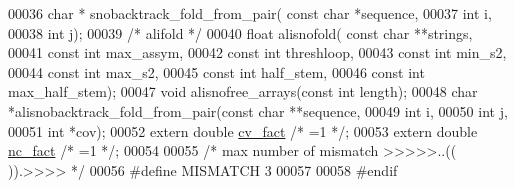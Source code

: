 \begin{DoxyCode}
00036 \textcolor{keywordtype}{char} * snobacktrack\_fold\_from\_pair( \textcolor{keyword}{const} \textcolor{keywordtype}{char} *sequence,
00037                                     \textcolor{keywordtype}{int} i,
00038                                     \textcolor{keywordtype}{int} j);
00039 \textcolor{comment}{/* alifold */}
00040 \textcolor{keywordtype}{float} alisnofold( \textcolor{keyword}{const} \textcolor{keywordtype}{char} **strings,
00041                   \textcolor{keyword}{const} \textcolor{keywordtype}{int} max\_assym,
00042                   \textcolor{keyword}{const} \textcolor{keywordtype}{int} threshloop, 
00043                   \textcolor{keyword}{const} \textcolor{keywordtype}{int} min\_s2,
00044                   \textcolor{keyword}{const} \textcolor{keywordtype}{int} max\_s2,
00045                   \textcolor{keyword}{const} \textcolor{keywordtype}{int} half\_stem,
00046                   \textcolor{keyword}{const} \textcolor{keywordtype}{int} max\_half\_stem);
00047 \textcolor{keywordtype}{void}  alisnofree\_arrays(\textcolor{keyword}{const} \textcolor{keywordtype}{int} length);
00048 \textcolor{keywordtype}{char}  *alisnobacktrack\_fold\_from\_pair(\textcolor{keyword}{const} \textcolor{keywordtype}{char} **sequence,
00049                                       \textcolor{keywordtype}{int} i,
00050                                       \textcolor{keywordtype}{int} j,
00051                                       \textcolor{keywordtype}{int} *cov);
00052 \textcolor{keyword}{extern} \textcolor{keywordtype}{double} \hyperlink{group__consensus__fold_gaf3cbac6ff5d706d6e414677841ddf94c}{cv\_fact} \textcolor{comment}{/* =1 */};
00053 \textcolor{keyword}{extern} \textcolor{keywordtype}{double} \hyperlink{group__consensus__fold_ga502948a122a2af5b914355b1f3ea2f61}{nc\_fact} \textcolor{comment}{/* =1 */};
00054 
00055 \textcolor{comment}{/* max number of mismatch >>>>>..((   )).>>>> */}
00056 \textcolor{preprocessor}{#define MISMATCH 3}
00057 
00058 \textcolor{preprocessor}{#endif}
\end{DoxyCode}
